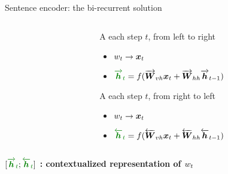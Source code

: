 \begin{frame}{Sentence encoder: the bi-recurrent solution}
\begin{columns}
\begin{column}{0.5\textwidth}
\begin{center}
      \end{center}
    \end{column}
    \begin{column}{0.5\textwidth}
      A each step $t$, from left to right
      \begin{itemize}
      \item $w_t \rightarrow \boldsymbol{x}_t$
      \item ${\greenhc\overrightarrow{\seq{h}}_t } = f(\overrightarrow{\seq{W}}_{vh} \inp_t + \overrightarrow{\seq{W}}_{hh}\overrightarrow{\seq{h}}_{t-1})$
      \end{itemize}
      A each step $t$, from right to left
      \begin{itemize}
      \item $w_t \rightarrow \boldsymbol{x}_t$
      \item ${\greenhc\overleftarrow{\seq{h}}_t} = f(\overleftarrow{\seq{W}}_{vh} \inp_t + \overleftarrow{\seq{W}}_{hh}\overleftarrow{\seq{h}}_{t-1})$
      \end{itemize}
    \end{column}
  \end{columns}
  \begin{center}
\textbf{    $[ {\greenhc\overrightarrow{\seq{h}}_t} ;
  {\greenhc\overleftarrow{\seq{h}}_t}]$ : contextualized
  representation of  ${w}_t$}
  \end{center}
\end{frame}

